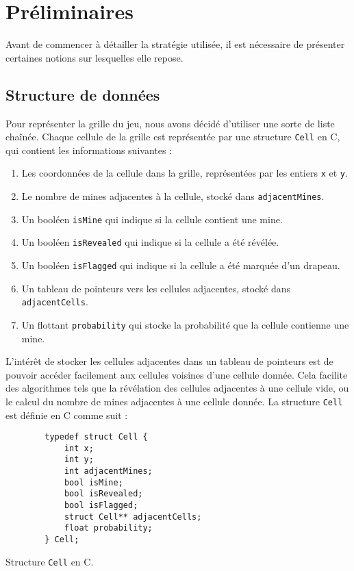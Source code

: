 \chapter{Préliminaires}
\label{cp:preliminaires}

Avant de commencer à détailler la stratégie utilisée, il est nécessaire de présenter certaines notions sur lesquelles elle repose.
\section{Structure de données}

Pour représenter la grille du jeu, nous avons décidé d'utiliser une sorte de liste chaînée. Chaque cellule de la grille est représentée par une structure \texttt{Cell} en C, qui contient les informations suivantes :
\begin{enumerate}
    \item Les coordonnées de la cellule dans la grille, représentées par les entiers \texttt{x} et \texttt{y}.
    \item Le nombre de mines adjacentes à la cellule, stocké dans \texttt{adjacentMines}.
    \item Un booléen \texttt{isMine} qui indique si la cellule contient une mine.
    \item Un booléen \texttt{isRevealed} qui indique si la cellule a été révélée.
    \item Un booléen \texttt{isFlagged} qui indique si la cellule a été marquée d'un drapeau.
    \item Un tableau de pointeurs vers les cellules adjacentes, stocké dans \texttt{adjacentCells}.
    \item Un flottant \texttt{probability} qui stocke la probabilité que la cellule contienne une mine.
\end{enumerate}

L'intérêt de stocker les cellules adjacentes dans un tableau de pointeurs est de pouvoir accéder facilement aux cellules voisines d'une cellule donnée. Cela facilite des algorithmes tels que la révélation des cellules adjacentes à une cellule vide, ou le calcul du nombre de mines adjacentes à une cellule donnée.
\newline
\newline
La structure \texttt{Cell} est définie en C comme suit :

\begin{longlisting}
    \begin{verbatim}
        typedef struct Cell {
            int x;
            int y;
            int adjacentMines;
            bool isMine;
            bool isRevealed;
            bool isFlagged;
            struct Cell** adjacentCells;
            float probability;
        } Cell;
    \end{verbatim}
    \caption{Structure \texttt{Cell} en C.}
    \label{listing:c-path}
\end{longlisting}
